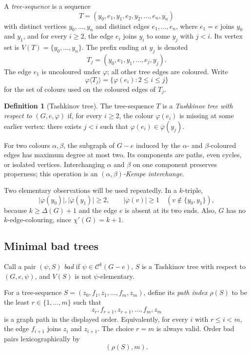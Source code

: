 \documentclass[11pt]{article}
\theoremstyle{definition}
\newtheorem{definition}[theorem]{Definition}
\newcommand{\calC}{\mathcal C}
\newcommand{\abs}[1]{\lvert #1\rvert}
\newcommand{\missing}[1]{\overline{#1}}
\newcommand{\phiT}[1]{\varphi\langle #1\rangle}
\begin{document}
A \emph{tree-sequence} is a sequence
\[
  T=(y_0,e_1,y_1,e_2,y_2,\ldots,e_n,y_n)
  \tag{4.1}\label{eq:tree-sequence}
\]
with distinct vertices $y_0,\ldots,y_n$ and distinct edges
$e_1,\ldots,e_n$, where $e_1=e$ joins $y_0$ and $y_1$, and for every
$i\ge2$, the edge $e_i$ joins $y_i$ to some $y_j$ with $j<i$.  Its vertex set
is $V(T)=\{y_0,\ldots,y_n\}$.  The prefix ending at $y_j$ is denoted
\[
  T_j=(y_0,e_1,y_1,\ldots,e_j,y_j).
\]
The edge $e_1$ is uncoloured under $\varphi$; all other tree edges are coloured.
Write
\[
  \phiT{T_j}=\{\varphi(e_i):2\le i\le j\}
\]
for the set of colours used on the coloured edges of $T_j$.

\begin{definition}[Tashkinov tree]
The tree-sequence $T$ is a \emph{Tashkinov tree with respect to
$(G,e,\varphi)$} if, for every $i\ge2$, the colour $\varphi(e_i)$ is missing at
some earlier vertex: there exists $j<i$ such that
$\varphi(e_i)\in\missing\varphi(y_j)$.
\end{definition}

For two colours $\alpha,\beta$, the subgraph of $G-e$ induced by the
$\alpha$- and $\beta$-coloured edges has maximum degree at most two.  Its
components are paths, even cycles, or isolated vertices.  Interchanging
$\alpha$ and $\beta$ on one component preserves properness; this operation is
an \emph{$(\alpha,\beta)$-Kempe interchange}.

Two elementary observations will be used repeatedly.  In a $k$-triple,
\[
  \abs{\missing\varphi(y_0)},\abs{\missing\varphi(y_1)}\ge2,
  \qquad
  \abs{\missing\varphi(v)}\ge1\quad(v\notin\{y_0,y_1\}),
  \tag{4.2}\label{eq:missing-lower}
\]
because $k\ge\Delta(G)+1$ and the edge $e$ is absent at its two ends.
Also, $G$ has no $k$-edge-colouring, since $\chi'(G)=k+1$.

\subsection{Minimal bad trees}

Call a pair $(\psi,S)$ \emph{bad} if
$\psi\in\calC^k(G-e)$, $S$ is a Tashkinov tree with respect to
$(G,e,\psi)$, and $V(S)$ is not $\psi$-elementary.

For a tree-sequence $S=(z_0,f_1,z_1,\ldots,f_m,z_m)$, define its
\emph{path index} $\rho(S)$ to be the least $r\in\{1,\ldots,m\}$ such that
\[
  z_r,f_{r+1},z_{r+1},\ldots,f_m,z_m
\]
is a graph path in the displayed order.  Equivalently, for every $i$ with
$r\le i<m$, the edge $f_{i+1}$ joins $z_i$ and $z_{i+1}$.  The choice $r=m$
is always valid.  Order bad pairs lexicographically by
\[
  (\rho(S),m).
\]
\end{document}
